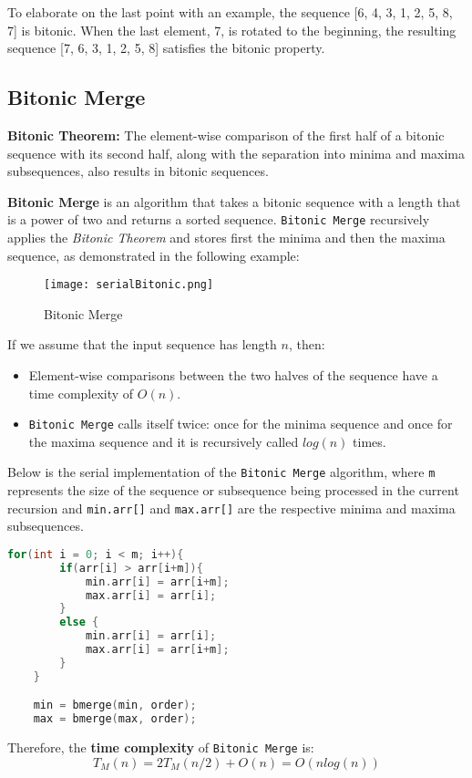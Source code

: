 \documentclass[12pt]{article}
\begin{document}
To elaborate on the last point with an example, the sequence [6, 4, 3, 1, 2, 5, 8, 7] is bitonic. When the last element, 7, is rotated to the beginning, the resulting sequence [7, 6, 3, 1, 2, 5, 8] satisfies the bitonic property.

\subsection{Bitonic Merge}

\begin{definitionbox}
\textbf{Bitonic Theorem:} The element-wise comparison of the first half of a bitonic sequence with its second half, along with the separation into minima and maxima subsequences, also results in bitonic sequences.
\end{definitionbox}

\textbf{Bitonic Merge} is an algorithm that takes a bitonic sequence with a length that is a power of two and returns a sorted sequence. \texttt{Bitonic Merge} recursively applies the \textit{Bitonic Theorem} and stores first the minima and then the maxima sequence, as demonstrated in the following example:

\begin{figure}[H]
    \centering
    \texttt{[image: serialBitonic.png]}
    \caption{Bitonic Merge}
    \label{fig:enter-label}
\end{figure}

If we assume that the input sequence has length $n$, then:

\begin{itemize} 
\item Element-wise comparisons between the two halves of the sequence have a time complexity of $O(n)$.
\item \texttt{Bitonic Merge} calls itself twice: once for the minima sequence and once for the maxima sequence and it is recursively called $log(n)$ times. 
\end{itemize}

Below is the serial implementation of the \texttt{Bitonic Merge} algorithm, where \texttt{m} represents the size of the sequence or subsequence being processed in the current recursion and \texttt{min.arr[]} and \texttt{max.arr[]} are the respective minima and maxima subsequences.

\begin{lstlisting}[language=C]
    for(int i = 0; i < m; i++){
        if(arr[i] > arr[i+m]){
            min.arr[i] = arr[i+m];
            max.arr[i] = arr[i];
        } 
        else {
            min.arr[i] = arr[i];
            max.arr[i] = arr[i+m];
        }
    }

    min = bmerge(min, order);
    max = bmerge(max, order);
\end{lstlisting}
\vspace{0.3cm}
Therefore, the \textbf{time complexity} of \texttt{Bitonic Merge} is:
\[T_M(n) = 2T_M(n/2) + O(n) = O(nlog(n))\]
\end{document}
